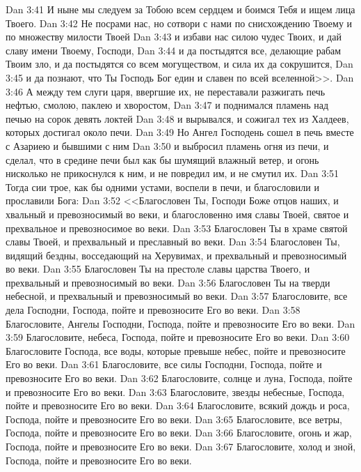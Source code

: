 \vs Dan 3:41 И ныне мы следуем за Тобою всем сердцем и боимся Тебя и ищем лица Твоего.
\vs Dan 3:42 Не посрами нас, но сотвори с нами по снисхождению Твоему и по множеству милости Твоей
\vs Dan 3:43 и избави нас силою чудес Твоих, и дай славу имени Твоему, Господи,
\vs Dan 3:44 и да постыдятся все, делающие рабам Твоим зло, и да постыдятся со всем могуществом, и сила их да сокрушится,
\vs Dan 3:45 и да познают, что Ты Господь Бог един и славен по всей вселенной>>.
\rsbpar\vs Dan 3:46 А между тем слуги царя, ввергшие их, не переставали разжигать печь нефтью, смолою, паклею и хворостом,
\vs Dan 3:47 и поднимался пламень над печью на сорок девять локтей
\vs Dan 3:48 и вырывался, и сожигал тех из Халдеев, которых достигал около печи.
\vs Dan 3:49 Но Ангел Господень сошел в печь вместе с Азариею и бывшими с ним
\vs Dan 3:50 и выбросил пламень огня из печи, и сделал, что в средине печи был как бы шумящий влажный ветер, и огонь нисколько не прикоснулся к ним, и не повредил им, и не смутил их.
\vs Dan 3:51 Тогда сии трое, как бы одними устами, воспели в печи, и благословили и прославили Бога:
\rsbpar\vs Dan 3:52 <<Благословен Ты, Господи Боже отцов наших, и хвальный и превозносимый во веки, и благословенно имя славы Твоей, святое и прехвальное и превозносимое во веки.
\vs Dan 3:53 Благословен Ты в храме святой славы Твоей, и прехвальный и преславный во веки.
\vs Dan 3:54 Благословен Ты, видящий бездны, восседающий на Херувимах, и прехвальный и превозносимый во веки.
\vs Dan 3:55 Благословен Ты на престоле славы царства Твоего, и прехвальный и превозносимый во веки.
\vs Dan 3:56 Благословен Ты на тверди небесной, и прехвальный и превозносимый во веки.
\vs Dan 3:57 Благословите, все дела Господни, Господа, пойте и превозносите Его во веки.
\vs Dan 3:58 Благословите, Ангелы Господни, Господа, пойте и превозносите Его во веки.
\vs Dan 3:59 Благословите, небеса, Господа, пойте и превозносите Его во веки.
\vs Dan 3:60 Благословите Господа, все воды, которые превыше небес, пойте и превозносите Его во веки.
\vs Dan 3:61 Благословите, все силы Господни, Господа, пойте и превозносите Его во веки.
\vs Dan 3:62 Благословите, солнце и луна, Господа, пойте и превозносите Его во веки.
\vs Dan 3:63 Благословите, звезды небесные, Господа, пойте и превозносите Его во веки.
\vs Dan 3:64 Благословите, всякий дождь и роса, Господа, пойте и превозносите Его во веки.
\vs Dan 3:65 Благословите, все ветры, Господа, пойте и превозносите Его во веки.
\vs Dan 3:66 Благословите, огонь и жар, Господа, пойте и превозносите Его во веки.
\vs Dan 3:67 Благословите, холод и зной, Господа, пойте и превозносите Его во веки.
